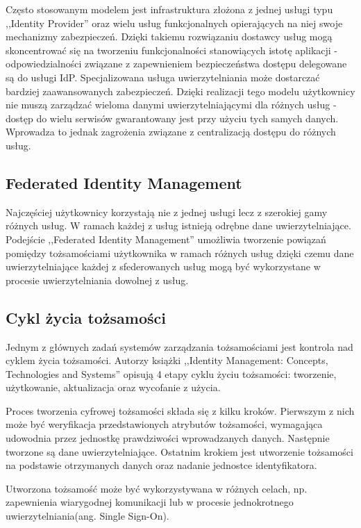 		Często stosowanym modelem jest infrastruktura złożona z jednej usługi typu ,,Identity Provider'' oraz wielu usług funkcjonalnych opierających na niej swoje mechanizmy zabezpieczeń. Dzięki takiemu rozwiązaniu dostawcy usług mogą skoncentrować się na tworzeniu funkcjonalności stanowiących istotę aplikacji - odpowiedzialności związane z zapewnieniem bezpieczeństwa dostępu delegowane są do usługi IdP. Specjalizowana usługa uwierzytelniania może dostarczać bardziej zaawansowanych zabezpieczeń. Dzięki realizacji tego modelu użytkownicy nie muszą zarządzać wieloma danymi uwierzytelniającymi dla różnych usług - dostęp do wielu serwisów gwarantowany jest przy użyciu tych samych danych. Wprowadza to jednak zagrożenia związane z centralizacją dostępu do różnych usług.

	\subsection{Federated Identity Management}

		Najczęściej użytkownicy korzystają nie z jednej usługi lecz z szerokiej gamy różnych usług. W ramach każdej z usług istnieją odrębne dane uwierzytelniające. Podejście ,,Federated Identity Management'' umożliwia tworzenie powiązań pomiędzy tożsamościami użytkownika w ramach różnych usług dzięki czemu dane uwierzytelniające każdej z sfederowanych usług mogą być wykorzystane w procesie uwierzytelniania dowolnej z usług.

	\subsection{Cykl życia tożsamości}

		Jednym z głównych zadań systemów zarządzania tożsamościami jest kontrola nad cyklem życia tożsamości. Autorzy książki ,,Identity Management: Concepts, Technologies and Systems'' opisują 4 etapy cyklu życiu tożsamości: tworzenie, użytkowanie, aktualizacja oraz wycofanie z użycia\cite{Bertino11}.

		Proces tworzenia cyfrowej tożsamości składa się z kilku kroków. Pierwszym z nich może być weryfikacja przedstawionych atrybutów tożsamości, wymagająca udowodnia przez jednostkę prawdziwości wprowadzanych danych. Następnie tworzone są dane uwierzytelniające. Ostatnim krokiem jest utworzenie tożsamości na podstawie otrzymanych danych oraz nadanie jednostce identyfikatora.

		Utworzona tożsamość może być wykorzystywana w różnych celach, np. zapewnienia wiarygodnej komunikacji lub w procesie jednokrotnego uwierzytelniania(ang. Single Sign-On).

